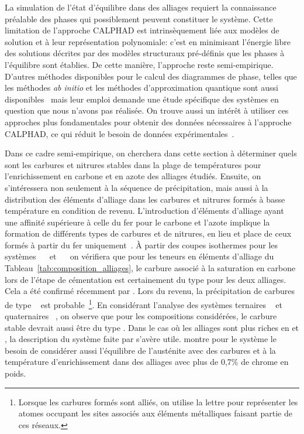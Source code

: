 La simulation de l'état d'équilibre dans des alliages requiert la connaissance préalable des phases qui possiblement peuvent constituer le système. Cette limitation de l'approche CALPHAD est intrinsèquement liée aux modèles de solution et à leur représentation polynomiale: c'est en minimisant l'énergie libre des solutions décrites par des modèles structuraux pré-définis que les phases à l'équilibre sont établies. De cette manière, l'approche reste semi-empirique. D'autres méthodes disponibles pour le calcul des diagrammes de phase, telles que les méthodes \textit{ab initio} et les méthodes d'approximation quantique sont aussi disponibles~\cite{Bozzolo2007} mais leur emploi demande une étude spécifique des systèmes en question que nous n'avons pas réalisée. On trouve aussi un intérêt à utiliser ces approches plus fondamentales pour obtenir des données nécessaires à l'approche CALPHAD, ce qui réduit le besoin de données expérimentales~\cite{Bozzolo2007}.
 
Dans ce cadre semi-empirique, on cherchera dans cette section à déterminer quels sont les carbures et nitrures stables dans la plage de températures pour l'enrichissement en carbone et en azote des alliages étudiés. Ensuite, on s'intéressera non seulement à la séquence de précipitation, mais aussi à la distribution des éléments d'alliage dans les carbures et nitrures formés à basse température en condition de revenu. L'introduction d'éléments d'alliage ayant une affinité supérieure à celle du fer pour le carbone et l'azote implique la formation de différents types de carbures et de nitrures, en lieu et place de ceux formés à partir du fer uniquement~\cite{Steel2006}. À partir des coupes isothermes pour les systèmes  ~\cite{Chatfield1977} et  ~\cite{Hillert197797} on vérifiera que pour les teneurs en éléments d'alliage du Tableau~\ref{tab:composition_alliages}, le carbure associé à la saturation en carbone lors de l'étape de cémentation est certainement du type  pour les deux alliages. Cela a été confirmé récemment par \citet{Djurovic2011479}. Lors du revenu, la précipitation de carbures de type ~\cite{Kuo1985991} est probable~\footnote{Lorsque les carbures formés sont alliés, on utilise la lettre  pour représenter les atomes occupant les sites associés aux éléments métalliques faisant partie de ces réseaux.}. En considérant l'analyse des systèmes ternaires ~\cite{Benz1974} et quaternaires ~\cite{Hillert19912187}, on observe que pour les compositions considérées, le carbure stable devrait aussi être du type . Dans le cas où les alliages sont plus riches en  et , la description du système  faite par \citet{Hillert1992} s'avère utile. \citet{Raghavan1992} montre pour le système  le besoin de considérer aussi l'équilibre de l'austénite avec des carbures  et  à la température d'enrichissement dans des alliages avec plus de 0,7\% de chrome en poids. 

